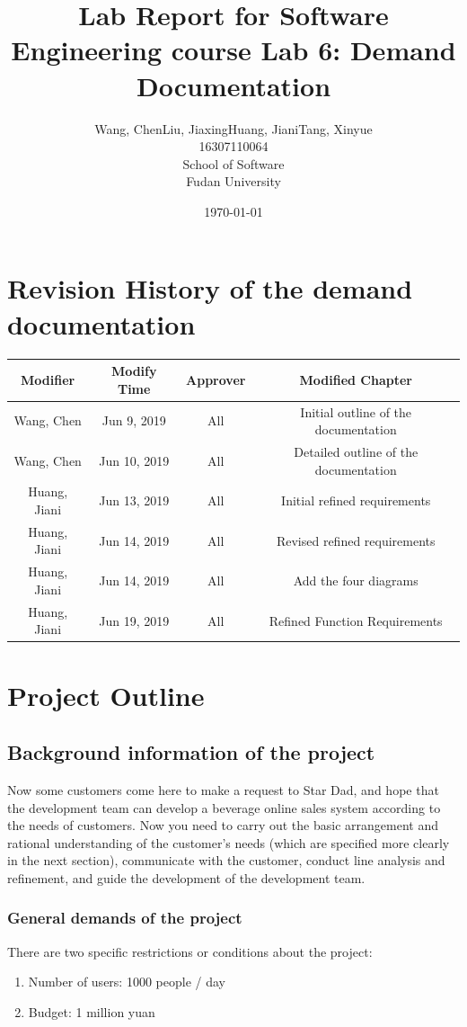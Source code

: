 \documentclass[a4paper]{report}
\title{Lab Report for Software Engineering course \newline
 Lab 6: Demand Documentation}
\author{Wang, Chen\qquad Liu, Jiaxing\qquad Huang, Jiani\qquad Tang, Xinyue \\
16307110064\qquad17302010049\qquad 17302010063\qquad 16307110476 \\
School of Software\\
Fudan University
}
\date{\today}
\begin{document}
\maketitle

\tableofcontents
\chapter{Revision History of the demand documentation}

\begin{tabular}{|c|c|c|c|} 
\hline 
Modifier&Modify Time&Approver&Modified Chapter\\
\hline  
Wang, Chen&Jun 9, 2019&All&Initial outline of the documentation\\
\hline 
Wang, Chen&Jun 10, 2019&All&Detailed outline of the documentation\\
\hline 
Huang, Jiani&Jun 13, 2019&All&Initial refined requirements\\
\hline 
Huang, Jiani&Jun 14, 2019&All&Revised refined requirements\\
\hline 
Huang, Jiani&Jun 14, 2019&All&Add the four diagrams\\
\hline 
Huang, Jiani&Jun 19, 2019&All&Refined Function Requirements\\
\hline 

\end{tabular}

\chapter{Project Outline}
\section{Background information of the project}
Now some customers come here to make a request to Star Dad, and hope that the development team can develop a beverage online sales system according to the needs of customers. Now you need to carry out the basic arrangement and rational understanding of the customer's needs (which are specified more clearly in the next section), communicate with the customer, conduct line analysis and refinement, and guide the development of the development team.
\par
\subsection{General demands of the project}
There are two specific restrictions or conditions about the project:
\begin{enumerate}
\item
Number of users: 1000 people / day
\item
Budget: 1 million yuan

\end{enumerate}
\end{document}

